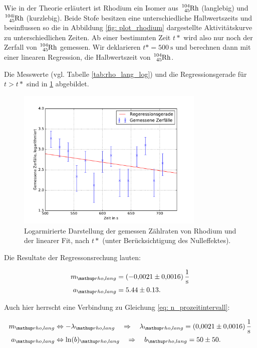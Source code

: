 Wie in der Theorie erläutert ist Rhodium ein Isomer aus $\ce{^{104}_{45} Rh}$ (langlebig) und
$\ce{^{104i}_{45} Rh}$ (kurzlebig). Beide Stofe besitzen eine unterschiedliche Halbwertszeits und
beeinflussen so die in Abbildung \ref{fig: plot_rhodium} dargestellte Aktivitätskurve zu unterschiedlichen
Zeiten.
Ab einer bestimmten Zeit $t*$ wird also nur noch der Zerfall von $\ce{^{104}_{45} Rh}$
gemessen.
Wir deklarieren $t*=\SI{500}{\second}$ und berechnen dann mit einer linearen Regression,
die Halbwertszeit von $\ce{^{104}_{45} Rh}$.

Die Messwerte (vgl. Tabelle \ref{tab:rho_lang_log}) und die Regressionsgerade für $t>t*$ sind in \ref{fig: plot_rhodium_lang} abgebildet.

\begin{figure}
  \centering
  \includegraphics[width=0.8\textwidth]{pics/rhodium_lang_miterror.pdf}
  \caption{Logarmirierte Darstellung der gemessen Zählraten von Rhodium und der linearer Fit, nach $t*$  (unter Berücksichtigung des Nulleffektes).}
  \label{fig: plot_rhodium_lang}
\end{figure}

Die Resultate der Regressonsrechung lauten:

\begin{align}
  \label{eq:parameter_rhodium_lang}
  \begin{aligned}
    m\ua{rho,lang}&=\SI{-0.0021\pm0.0016}{\per\second}\\
    a\ua{rho,lang}&=5.44\pm0.13.
  \end{aligned}
\end{align}


Auch hier herrscht eine Verbindung zu Gleichung \eqref{eq: n_prozeitintervall}:

\begin{align}
  \label{eq:parameter_rhodium_lang_lambda}
  \begin{aligned}
    m\ua{rho,lang}&\Leftrightarrow -\lambda\ua{rho,lang} \quad \Rightarrow \quad \lambda\ua{rho,lang}=\SI{0.0021\pm0.0016}{\per\second}\\
    a\ua{rho,lang}&\Leftrightarrow \ln(b)\ua{rho,lang} \quad \Rightarrow \quad b\ua{rho,lang} =50\pm 50.
  \end{aligned}
\end{align}

